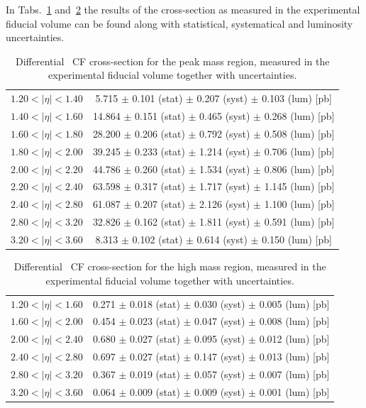 In Tabs.~\ref{tab:Zee_peak} and~\ref{tab:Zee_high} the results of the cross-section as measured in the experimental fiducial volume can be found along with statistical, systematical and luminosity uncertainties.

\begin{table}
\centering
\begin{tabular}{lc}
\hline
$1.20 < |\eta| <1.40$          & 5.715 $\pm$ 0.101 (stat) $\pm$ 0.207 (syst) $\pm$ 0.103 (lum) [pb]  \\
$1.40 < |\eta| <1.60$          & 14.864 $\pm$ 0.151 (stat) $\pm$ 0.465 (syst) $\pm$ 0.268 (lum) [pb]  \\
$1.60 < |\eta| <1.80$          & 28.200 $\pm$ 0.206 (stat) $\pm$ 0.792 (syst) $\pm$ 0.508 (lum) [pb]  \\
$1.80 < |\eta| <2.00$          & 39.245 $\pm$ 0.233 (stat) $\pm$ 1.214 (syst) $\pm$ 0.706 (lum) [pb]  \\
$2.00 < |\eta| <2.20$          & 44.786 $\pm$ 0.260 (stat) $\pm$ 1.534 (syst) $\pm$ 0.806 (lum) [pb]  \\
$2.20 < |\eta| <2.40$          & 63.598 $\pm$ 0.317 (stat) $\pm$ 1.717 (syst) $\pm$ 1.145 (lum) [pb]  \\
$2.40 < |\eta| <2.80$          & 61.087 $\pm$ 0.207 (stat) $\pm$ 2.126 (syst) $\pm$ 1.100 (lum) [pb]  \\
$2.80 < |\eta| <3.20$          & 32.826 $\pm$ 0.162 (stat) $\pm$ 1.811 (syst) $\pm$ 0.591 (lum) [pb]  \\
$3.20 < |\eta| <3.60$          & 8.313 $\pm$ 0.102 (stat) $\pm$ 0.614 (syst) $\pm$ 0.150 (lum) [pb]  \\
\hline
\end{tabular}
\caption{Differential \Zee\ CF cross-section for the peak mass region, measured in the experimental fiducial volume together with uncertainties.}
\label{tab:Zee_peak}
\end{table}

\begin{table}
\centering
\begin{tabular}{lc}
\hline
$1.20 < |\eta| <1.60$          & 0.271 $\pm$ 0.018 (stat) $\pm$ 0.030 (syst) $\pm$ 0.005 (lum) [pb]  \\
$1.60 < |\eta| <2.00$          & 0.454 $\pm$ 0.023 (stat) $\pm$ 0.047 (syst) $\pm$ 0.008 (lum) [pb]  \\
$2.00 < |\eta| <2.40$          & 0.680 $\pm$ 0.027 (stat) $\pm$ 0.095 (syst) $\pm$ 0.012 (lum) [pb]  \\
$2.40 < |\eta| <2.80$          & 0.697 $\pm$ 0.027 (stat) $\pm$ 0.147 (syst) $\pm$ 0.013 (lum) [pb]  \\
$2.80 < |\eta| <3.20$          & 0.367 $\pm$ 0.019 (stat) $\pm$ 0.057 (syst) $\pm$ 0.007 (lum) [pb]  \\
$3.20 < |\eta| <3.60$          & 0.064 $\pm$ 0.009 (stat) $\pm$ 0.009 (syst) $\pm$ 0.001 (lum) [pb]  \\
\hline
\end{tabular}
\caption{Differential \Zee\ CF cross-section for the high mass region, measured in the experimental fiducial volume together with uncertainties.}
\label{tab:Zee_high}
\end{table}


